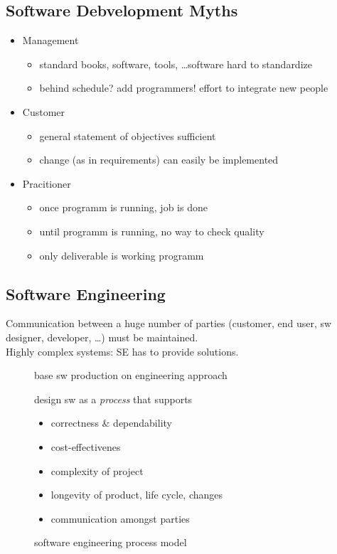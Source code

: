 \documentclass[a4paper, 10pt]{article}
\begin{document}
\subsection*{Software Debvelopment Myths}
\begin{itemize}
	\item Management
		\begin{itemize}
			\item standard books, software, tools, \dots \follows software hard to standardize
			\item behind schedule? add programmers! \follows effort to integrate new people
		\end{itemize}
	\item Customer
		\begin{itemize}
			\item general statement of objectives sufficient
			\item change (as in requirements) can easily be implemented
		\end{itemize}
	\item Pracitioner
		\begin{itemize}
			\item once programm is running, job is done
			\item until programm is running, no way to check quality
			\item only deliverable is working programm
		\end{itemize}
\end{itemize}

\subsection*{Software Engineering}
Communication between a huge number of parties (customer, end user, sw designer, developer, \dots) must be maintained. \\
Highly complex systems: SE has to provide solutions.

\begin{description}
	\item[\follows] base sw production on engineering approach
	\item[\follows] design sw as a \emph{process} that supports
		\begin{itemize}
			\item correctness \& dependability
			\item cost-effectivenes
			\item complexity of project
			\item longevity of product, life cycle, changes
			\item communication amongst parties
		\end{itemize}
	\item[\follows] software engineering process model
\end{description}
\end{document}
